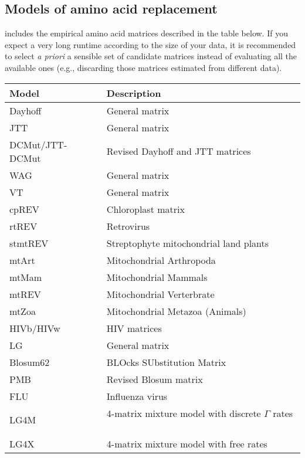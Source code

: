 \subsection{Models of amino acid replacement}
\label{sec:aamodels}

\modeltest includes the empirical amino acid matrices described in the table below.
If you expect a very long runtime according to the size of your data,
it is recommended to select {\em a priori} a sensible set of candidate matrices instead of evaluating all the available ones
(e.g., discarding those matrices estimated from different data).

\begin{tabular}{ll}
  \hline
  {\bf Model} & {\bf Description} \\
  \hline
  Dayhoff &	General matrix~\citep{dayhoff1978} \\
  \hline
  JTT &	General matrix~\citep{jones1992} \\
  \hline
  DCMut/JTT-DCMut & Revised Dayhoff and JTT matrices~\citep{kosiol2005} \\
  \hline
  WAG & General matrix~\citep{whelan2001} \\
  \hline
  VT & General matrix~\citep{muller2000}  \\
  \hline
  cpREV & Chloroplast matrix~\citep{adachi2000} \\
  \hline
  rtREV & Retrovirus~\citep{dimmic2002} \\
  \hline
  stmtREV & Streptophyte mitochondrial land plants~\citep{liu2014} \\
  \hline
  mtArt & Mitochondrial Arthropoda~\citep{abascal2007} \\
  \hline
  mtMam & Mitochondrial Mammals~\citep{yang1998} \\
  \hline
  mtREV & Mitochondrial Verterbrate~\citep{adachi1996} \\
  \hline
  mtZoa & Mitochondrial Metazoa (Animals)~\citep{rota2009} \\
  \hline
  HIVb/HIVw & HIV matrices ~\citep{nickle2007} \\
  \hline
  LG & General matrix~\citep{le2008} \\
  \hline
  Blosum62 & BLOcks SUbstitution Matrix~\citep{henikoff1992} \\
  \hline
  PMB & Revised Blosum matrix~\citep{veerassamy2003} \\
  \hline
  FLU & Influenza virus~\citep{dang2010} \\
  \hline
  LG4M & 4-matrix mixture model with discrete $\Gamma$ rates ~\citep{le2012} \\
  \hline
  LG4X & 4-matrix mixture model with free rates~\citep{le2012} \\
  \hline
\end{tabular}

